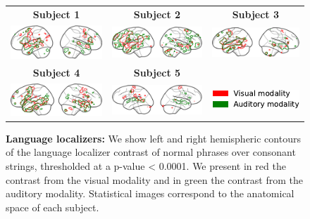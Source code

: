 \begin{figure}[ht]
\scriptsize
\hspace{-4ex}
\begin{tabular}{ccc}
\textbf{\Large Subject 1} & \textbf{\Large Subject 2} & \textbf{\Large Subject 3}\\
{\includegraphics[width=.33\linewidth]{figures/part_II/langloc_01.pdf}}
\hspace{-1ex}
&{\includegraphics[width=.33\linewidth]{figures/part_II/langloc_03.pdf}}
\hspace{-1ex}
&{\includegraphics[width=.33\linewidth]{figures/part_II/langloc_04.pdf}}
\hspace{-1ex}\\
\rule{0pt}{6ex}
\textbf{\Large Subject 4} & \textbf{\Large Subject 5} & {}\\
{\includegraphics[width=.33\linewidth]{figures/part_II/langloc_05.pdf}}
\hspace{-1ex}
&{\includegraphics[width=.33\linewidth]{figures/part_II/langloc_06.pdf}}
\hspace{-1ex}
&{\includegraphics[width=.2\linewidth]{figures/part_II/langloc_legend.pdf}}
\hspace{-1ex} \\
\end{tabular}
\vspace{3ex}
\caption{\textbf{Language localizers:} We show left and right hemispheric contours of the language localizer contrast of normal phrases over consonant strings, thresholded at a p-value < 0.0001.
We present in red the contrast from the visual modality and in green the contrast from the auditory modality. Statistical images correspond to the anatomical space of each subject.}
\label{fig:language_localizers}
\end{figure}

